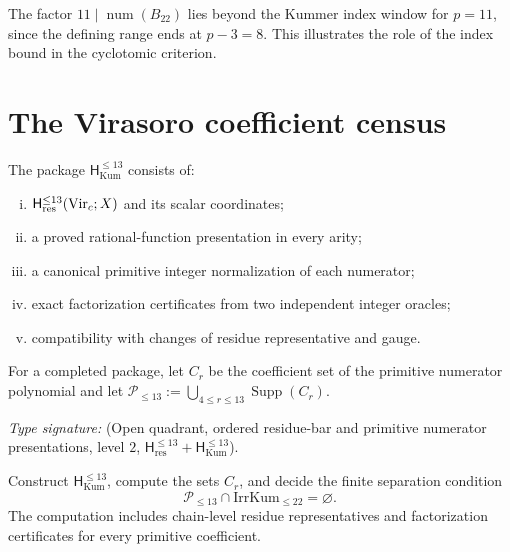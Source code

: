 \begin{remark}
\label{rem:regular-factor-11}
The factor \(11\mid\operatorname{num}(B_{22})\) lies beyond the
Kummer index window for \(p=11\), since the defining range ends at
\(p-3=8\).  This illustrates the role of the index bound in the
cyclotomic criterion.
\end{remark}

\section{The Virasoro coefficient census}

\begin{definition}
\ClaimStatusDefinitional
The package \(\mathsf H_{\mathrm{Kum}}^{\le13}\) consists of:
\begin{enumerate}[(i)]
\item \(\mathsf H_{\mathrm{res}}^{\le13}(\mathrm{Vir}_c;X)\) and its scalar
coordinates;
\item a proved rational-function presentation in every arity;
\item a canonical primitive integer normalization of each numerator;
\item exact factorization certificates from two independent integer
oracles;
\item compatibility with changes of residue representative and gauge.
\end{enumerate}
For a completed package, let \(C_r\) be the coefficient set of the
primitive numerator polynomial and let
\(\mathcal P_{\le13}:=\bigcup_{4\le r\le13}\operatorname{Supp}(C_r)\).
\end{definition}

\begin{problem}
\ClaimStatusOpen
\label{thm:higher-kummer-s-r-absence-through-r-13}
\emph{Type signature:}
\textup{(Open quadrant, ordered residue-bar and primitive numerator
presentations, level \(2\),
\(\mathsf H_{\mathrm{res}}^{\le13}
+\mathsf H_{\mathrm{Kum}}^{\le13}\)).}

Construct \(\mathsf H_{\mathrm{Kum}}^{\le13}\), compute the sets
\(C_r\), and decide the finite separation condition
\begin{equation}
 \mathcal P_{\le13}\cap\mathrm{IrrKum}_{\le22}=\varnothing.
 \label{eq:higher-kummer-s-r-absence}
 \label{eq:char-s-r-disjoint}
\end{equation}
The computation includes chain-level residue representatives and
factorization certificates for every primitive coefficient.
\end{problem}

